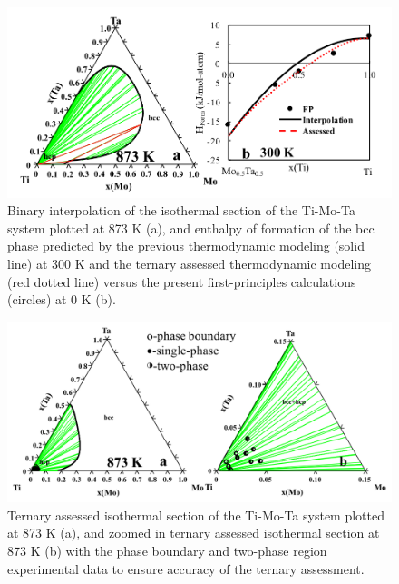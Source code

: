 \newpage
\begin{figure}[H]
	\centering
	\includegraphics[width=\textwidth]{Chapter-3/Figures/TiMoTa1.png}
	\caption{Binary interpolation of the isothermal section of the Ti-Mo-Ta system plotted at 873 K (a), and enthalpy of formation of the bcc phase predicted by the previous thermodynamic modeling (solid line) at 300 K and the ternary assessed thermodynamic modeling (red dotted line) versus the present first-principles calculations (circles) at 0 K (b).}
	\label{Ch3-figure:TiMoTa1}
\end{figure}

\newpage
\begin{figure}[H]
	\centering
	\includegraphics[width=\textwidth]{Chapter-3/Figures/TiMoTa2.png}
	\caption{Ternary assessed isothermal section of the Ti-Mo-Ta system plotted at 873 K (a), and zoomed in ternary assessed isothermal section at 873 K (b) with the phase boundary and two-phase region experimental data \cite{Nikitin1971} to ensure accuracy of the ternary assessment.}
	\label{Ch3-figure:TiMoTa2}
\end{figure}

